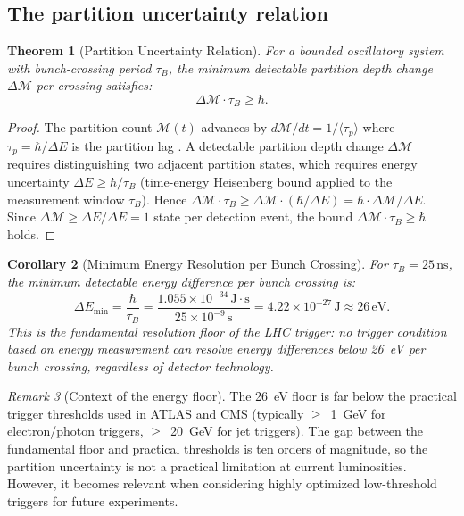 \documentclass[twocolumn,10pt,a4paper]{article}
\theoremstyle{thmstyle}
\newtheorem{theorem}{Theorem}[section]
\newtheorem{corollary}[theorem]{Corollary}
\theoremstyle{definition}
\theoremstyle{remark}
\newtheorem{remark}[theorem]{Remark}
\begin{document}
\subsection{The partition uncertainty relation}

\begin{theorem}[Partition Uncertainty Relation]
\label{thm:uncertainty}
For a bounded oscillatory system with bunch-crossing period $\tau_B$,
the minimum detectable partition depth change $\Delta\mathcal{M}$ per crossing
satisfies:
\begin{equation}
\Delta\mathcal{M} \cdot \tau_B \geq \hbar.
\label{eq:partition_uncertainty}
\end{equation}
\end{theorem}

\begin{proof}
The partition count $\mathcal{M}(t)$ advances by $d\mathcal{M}/dt = 1/\langle\tau_p\rangle$
where $\tau_p = \hbar/\Delta E$ is the partition lag \citep{companion:ion}.
A detectable partition depth change $\Delta\mathcal{M}$ requires
distinguishing two adjacent partition states, which requires energy uncertainty
$\Delta E \geq \hbar/\tau_B$ (time-energy Heisenberg bound applied to the
measurement window $\tau_B$). Hence
$\Delta\mathcal{M} \cdot \tau_B \geq \Delta\mathcal{M} \cdot (\hbar/\Delta E)
= \hbar \cdot \Delta\mathcal{M}/\Delta E$.
Since $\Delta\mathcal{M} \geq \Delta E / \Delta E = 1$ state per detection
event, the bound $\Delta\mathcal{M} \cdot \tau_B \geq \hbar$ holds.
\end{proof}

\begin{corollary}[Minimum Energy Resolution per Bunch Crossing]
\label{cor:energy}
For $\tau_B = 25\,\mathrm{ns}$, the minimum detectable energy difference
per bunch crossing is:
\begin{equation}
\Delta E_{\min} = \frac{\hbar}{\tau_B}
= \frac{1.055 \times 10^{-34}\,\mathrm{J\cdot s}}{25 \times 10^{-9}\,\mathrm{s}}
= 4.22 \times 10^{-27}\,\mathrm{J} \approx 26\,\mathrm{eV}.
\label{eq:energy_min}
\end{equation}
This is the \emph{fundamental resolution floor} of the LHC trigger:
no trigger condition based on energy measurement can resolve energy
differences below 26~eV per bunch crossing, regardless of detector technology.
\end{corollary}

\begin{remark}[Context of the energy floor]
The 26~eV floor is far below the practical trigger thresholds used in ATLAS
and CMS (typically $\geq$~1~GeV for electron/photon triggers, $\geq$~20~GeV
for jet triggers). The gap between the fundamental floor and practical
thresholds is ten orders of magnitude, so the partition uncertainty is
not a practical limitation at current luminosities. However, it becomes
relevant when considering highly optimized low-threshold triggers for
future experiments.
\end{remark}
\end{document}
